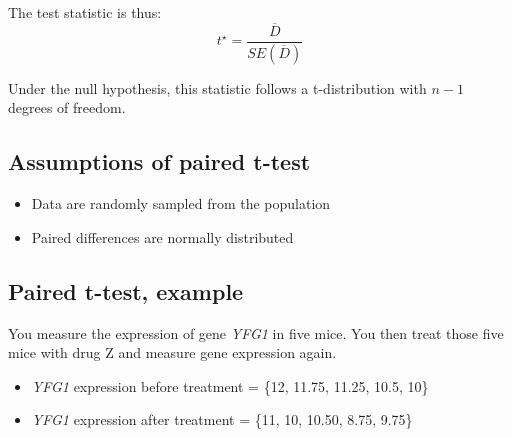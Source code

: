 \documentclass[]{book}
\newenvironment{Shaded}{\begin{snugshade}}{\end{snugshade}}
\newcommand{\CommentTok}[1]{\textcolor[rgb]{0.56,0.35,0.01}{\textit{#1}}}
\newcommand{\DataTypeTok}[1]{\textcolor[rgb]{0.13,0.29,0.53}{#1}}
\newcommand{\DecValTok}[1]{\textcolor[rgb]{0.00,0.00,0.81}{#1}}
\newcommand{\FloatTok}[1]{\textcolor[rgb]{0.00,0.00,0.81}{#1}}
\newcommand{\KeywordTok}[1]{\textcolor[rgb]{0.13,0.29,0.53}{\textbf{#1}}}
\newcommand{\NormalTok}[1]{#1}
\newcommand{\OperatorTok}[1]{\textcolor[rgb]{0.81,0.36,0.00}{\textbf{#1}}}
\newcommand{\OtherTok}[1]{\textcolor[rgb]{0.56,0.35,0.01}{#1}}
\newcommand{\StringTok}[1]{\textcolor[rgb]{0.31,0.60,0.02}{#1}}
\providecommand{\tightlist}{%
  \setlength{\itemsep}{0pt}\setlength{\parskip}{0pt}}
\theoremstyle{definition}
\theoremstyle{definition}
\theoremstyle{definition}
\theoremstyle{remark}
\begin{document}
The test statistic is thus: \[
t^\star = \frac{\overline{D}}{SE(\overline{D})}
\]

Under the null hypothesis, this statistic follows a t-distribution with
\(n-1\) degrees of freedom.

\hypertarget{assumptions-of-paired-t-test}{%
\subsection{Assumptions of paired
t-test}\label{assumptions-of-paired-t-test}}

\begin{itemize}
\tightlist
\item
  Data are randomly sampled from the population
\item
  Paired differences are normally distributed
\end{itemize}

\hypertarget{paired-t-test-example}{%
\subsection{Paired t-test, example}\label{paired-t-test-example}}

You measure the expression of gene \emph{YFG1} in five mice. You then
treat those five mice with drug Z and measure gene expression again.

\begin{itemize}
\tightlist
\item
  \emph{YFG1} expression before treatment = \{12, 11.75, 11.25, 10.5,
  10\}
\item
  \emph{YFG1} expression after treatment = \{11, 10, 10.50, 8.75, 9.75\}
\end{itemize}

\begin{Shaded}
\end{Shaded}
\end{document}
